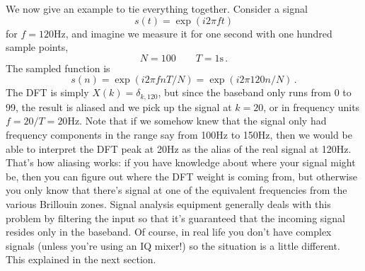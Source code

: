 
We now give an example to tie everything together. Consider a signal
\begin{displaymath}
  s(t) = \exp (i 2\pi f t)
\end{displaymath}
for $f=120\textrm{Hz}$, and imagine we measure it for one second with one hundred sample points,
\begin{displaymath}
  N=100 \qquad T=1\mathrm{s}
  \, .
\end{displaymath}
The sampled function is
\begin{displaymath}
  s(n) = \exp(i2\pi fnT/N) = \exp(i2\pi 120n/N)
  \, .
\end{displaymath}
The DFT is simply $X(k)=\delta_{k,120}$, but since the baseband only runs from 0 to 99, the result is aliased and we pick up the signal at $k=20$, or in frequency units $f=20/T=20\mathrm{Hz}$.
Note that if we somehow knew that the signal only had frequency components in the range say from 100Hz to 150Hz, then we would be able to interpret the DFT peak at 20Hz as the alias of the real signal at 120Hz.
That's how aliasing works: if you have knowledge about where your signal might be, then you can figure out where the DFT weight is coming from, but otherwise you only know that there's signal at one of the equivalent frequencies from the various Brillouin zones.
Signal analysis equipment generally deals with this problem by filtering the input so that it's guaranteed that the incoming signal resides only in the baseband.
Of course, in real life you don't have complex signals (unless you're using an IQ mixer!) so the situation is a little different.
This explained in the next section.
